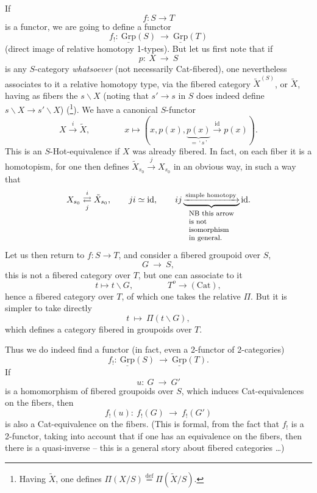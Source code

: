 \documentclass[11pt]{article}
\newcommand{\printedpage}[1]{\marginpar{\footnotesize p.~#1}}
\newcommand{\msp}[1]{\marginpar{\footnotesize [#1]}}
\newcommand{\Grp}{\underline{\mathrm{Grp}}}
\begin{document}
\printedpage{2}

\msp{page 2}

If
\[ f : S \longrightarrow T \]
is a functor, we are going to define a functor
\[ f_! :\ \Grp(S) \ \longrightarrow\ \Grp(T) \]
(direct image of relative homotopy 1-types). But let us first note that if
\[ p :\ X \ \longrightarrow\ S \]
is any $S$-category \textit{whatsoever} (not necessarily Cat-fibered), one nevertheless associates to it a relative homotopy type, via the fibered category $\tilde{X}^{(S)}$, or $\tilde{X}$, having as fibers the $s\backslash X$ (noting that $s' \longrightarrow s$ in $S$ does indeed define $s\backslash X \longrightarrow s'\backslash X$) (\footnote{Having $\tilde{X}$, one defines $\Pi(X/S) \overset{\text{def}}{=} \Pi(\tilde{X}/S)$.}). We have a canonical $S$-functor
\[ X \xrightarrow{\ i\ } \tilde{X}, \qquad\qquad x \longmapsto (x, p(x), \underbrace{p(x)}_{=\,\text{‘}\,s\,\text{’}} \xrightarrow{\ \mathrm{id}\ } p(x)). \]
This is an $S$-Hot-equivalence if $X$ was already fibered. In fact, on each fiber it is a homotopism, for one then defines $\tilde{X}_{s_0} \xrightarrow{\ j\ } X_{s_0}$ in an obvious way, in such a way that
\[
X_{s_0} \underset{j}{\overset{i}{\rightleftarrows}} \tilde{X}_{s_0}, \qquad ji \simeq \mathrm{id}, \qquad ij \underbrace{\xrightarrow{\text{simple homotopy}}}_{\text{\footnotesize\begin{tabular}{l}NB this arrow\\ is not \\ isomorphism\\ in general.\end{tabular}}} \mathrm{id}.
\]
Let us then return to $f : S \longrightarrow T$, and consider a fibered groupoid over $S$,
\[ G \ \longrightarrow\ S, \]
this is not a fibered category over $T$, but one can associate to it
\[ t \longmapsto t\backslash G, \qquad\qquad T^o \longrightarrow (\mathrm{Cat}), \]
hence a fibered category over $T$, of which one takes the relative $\Pi$. But it is simpler to take directly
\[ t \ \longmapsto\ \Pi(t\backslash G), \]
which defines a category fibered in groupoids over $T$.

\clearpage

\printedpage{3}

\msp{page 3}

Thus we do indeed find a functor (in fact, even a 2-functor of 2-categories)
\[ f_! :\ \Grp(S) \ \longrightarrow\ \Grp(T). \]
If
\[ u :\ G \ \longrightarrow\ G' \]
is a homomorphism of fibered groupoids over $S$, which induces Cat-equivalences on the fibers, then
\[ f_!(u) :\ f_!(G) \ \longrightarrow\ f_!(G') \]
is also a Cat-equivalence on the fibers. (This is formal, from the fact that $f_!$ is a 2-functor, taking into account that if one has an equivalence on the fibers, then there is a quasi-inverse -- this is a general story about fibered categories \dots)
\end{document}

